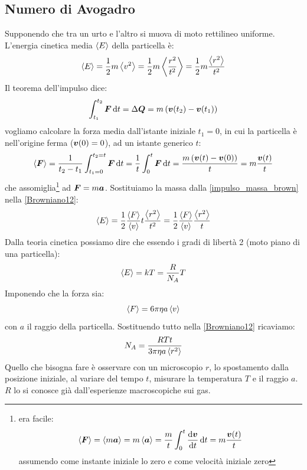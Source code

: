 \subsection{Numero di Avogadro}
Supponendo che tra un urto e l'altro si muova di moto rettilineo uniforme. L'energia cinetica media $\left<E\right>$ della particella è:
\begin{equation}
	\left<E\right>=\frac{1}{2}m\left<v^2\right>=\frac{1}{2}m\left<\frac{r^2}{t^2}\right>=\frac{1}{2}m\frac{\left<r^2\right>}{t^2}
	\label{Browniano12}
\end{equation}
Il teorema dell'impulso dice:
\[\int_{t_1}^{t_2}\boldsymbol{F}\,\mathrm{d} t=\Delta \boldsymbol{Q}=m\left(\boldsymbol{v}(t_2)-\boldsymbol{v}(t_1)\right)\]
vogliamo calcolare la forza media dall'istante iniziale $t_1=0$, in cui la particella è nell'origine ferma ($\boldsymbol{v}(0)=0$), ad un istante generico $t$:
\begin{equation}
	\left<\boldsymbol{F}\right>=\frac{1}{t_2-t_1}\int_{t_1=0}^{t_2=t}\boldsymbol{F}\,\mathrm{d} t=\frac{1}{t}\int_0^t\boldsymbol{F}\,\mathrm{d} t=\frac{m\left(\boldsymbol{v}(t)-\boldsymbol{v}(0)\right)}{t}=m\frac{\boldsymbol{v}(t)}{t}
	\label{impulso_massa_brown}
\end{equation}
che assomiglia\footnote{era facile:
	\[
		\left<\boldsymbol{F}\right>=\left<m\boldsymbol{a}\right>=m\left<\boldsymbol{a}\right>=\frac{m}{t}\int_0^t\frac{\mathrm{d}\boldsymbol{v}}{\mathrm{d} t}\,\mathrm{d} t=m\frac{\boldsymbol{v}(t)}{t}
	\]
	assumendo come instante iniziale lo zero e come velocità iniziale zero} ad $\boldsymbol{F}=m\boldsymbol{a}$. Sostituiamo la massa dalla \eqref{impulso_massa_brown} nella \eqref{Browniano12}:
\begin{equation}
	\left<E\right>=\frac{1}{2}\frac{\left<F\right>}{\left<v\right>}t\frac{\left<r^2\right>}{t^2}=\frac{1}{2}\frac{\left<F\right>}{\left<v\right>}\frac{\left<r^2\right>}{t}
\end{equation}
Dalla teoria cinetica possiamo dire che essendo i gradi di libertà 2 (moto piano di una particella):
\begin{equation}
	\left<E\right>=kT=\frac{R}{N_A}T
\end{equation}
Imponendo che la forza sia:
\begin{equation}
	\left<F\right>=6\pi\eta a\left<v\right>
\end{equation}
con $a$ il raggio della particella. Sostituendo tutto nella \eqref{Browniano12} ricaviamo:
\begin{equation}
	N_A=\frac{RTt}{3\pi\eta a\left<r^2\right>}
\end{equation}
Quello che bisogna fare è osservare con un microscopio $r$, lo spostamento dalla posizione iniziale, al variare del tempo $t$, misurare la temperatura $T$ e il raggio $a$. $R$ lo si conosce già dall'esperienze macroscopiche sui gas.
